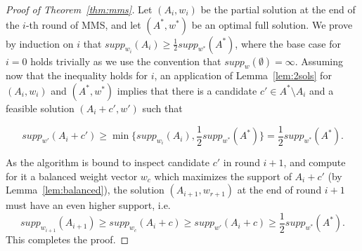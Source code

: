 \begin{proof}[Proof of Theorem~\ref{thm:mms}]
Let $(A_i, w_i)$ be the partial solution at the end of the $i$-th round of MMS, and let $(A^*, w^*)$ be an optimal full solution. We prove by induction on $i$ that $supp_{w_i}(A_i)\geq \frac{1}{2}supp_{w^*}(A^*)$, where the base case for $i=0$ holds trivially as we use the convention that $supp_w(\emptyset)=\infty$.
Assuming now that the inequality holds for $i$, an application of Lemma~\ref{lem:2sols} for $(A_i, w_i)$ and $(A^*, w^*)$ implies that there is a candidate $c'\in A^*\setminus A_i$ and a feasible solution $(A_i+c', w')$ such that 

$$supp_{w'}(A_i+c')\geq \min\Big\{supp_{w_i}(A_i), \frac{1}{2} supp_{w^*}(A^*)\Big\} = \frac{1}{2} supp_{w^*}(A^*).$$

As the algorithm is bound to inspect candidate $c'$ in round $i+1$, and compute for it a balanced weight vector $w_c$ which maximizes the support of $A_i+c'$ (by Lemma~\ref{lem:balanced}), the solution $(A_{i+1}, w_{r+1})$ at the end of round $i+1$ must have an even higher support, i.e. %
%
$$supp_{w_{i+1}}(A_{i+1})\geq supp_{w_c}(A_i+c) 
\geq supp_{w'}(A_i+c) \geq \frac{1}{2} supp_{w^*}(A^*).$$
%
This completes the proof.
\end{proof}

